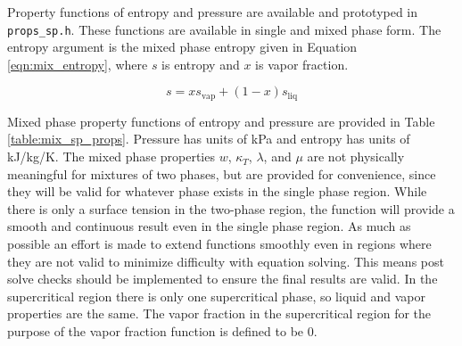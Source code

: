 \documentclass[oneside]{book}
\begin{document}
Property functions of entropy and pressure are available and prototyped in \texttt{props\_sp.h}.  These functions are available in single and mixed phase form.  The entropy argument is the mixed phase entropy given in Equation \ref{eqn:mix_entropy}, where $s$ is entropy and $x$ is vapor fraction. 

\begin{equation}\label{eqn:mix_entropy}
	s = x s_{\text{vap}} + (1 - x) s_{\text{liq}}
\end{equation}

Mixed phase property functions of entropy and pressure are provided in Table \ref{table:mix_sp_props}. Pressure has units of kPa and entropy has units of kJ/kg/K.  The mixed phase properties $w$, $\kappa_T$, $\lambda$, and $\mu$ are not physically meaningful for mixtures of two phases, but are provided for convenience, since they will be valid for whatever phase exists in the single phase region.  While there is only a surface tension in the two-phase region, the function will provide a smooth and continuous result even in the single phase region. As much as possible an effort is made to extend functions smoothly even in regions where they are not valid to minimize difficulty with equation solving.  This means post solve checks should be implemented to ensure the final results are valid.  In the supercritical region there is only one supercritical phase, so liquid and vapor properties are the same.  The vapor fraction in the supercritical region for the purpose of the vapor fraction function is defined to be 0.
\end{document}
